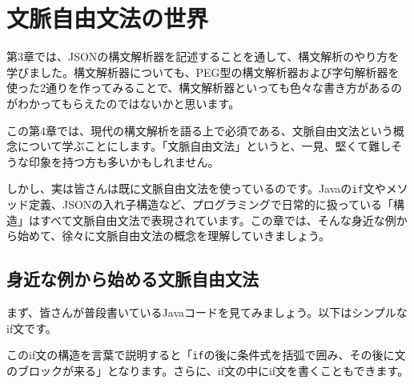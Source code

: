 \hypertarget{chapter4-ux6587ux8108ux81eaux7531ux6587ux6cd5ux306eux4e16ux754c}{%
\chapter{文脈自由文法の世界}\label{chapter4-ux6587ux8108ux81eaux7531ux6587ux6cd5ux306eux4e16ux754c}}

第3章では、JSONの構文解析器を記述することを通して、構文解析のやり方を学びました。構文解析器についても、PEG型の構文解析器および字句解析器を使った2通りを作ってみることで、構文解析器といっても色々な書き方があるのがわかってもらえたのではないかと思います。

この第4章では、現代の構文解析を語る上で必須である、文脈自由文法という概念について学ぶことにします。「文脈自由文法」というと、一見、堅くて難しそうな印象を持つ方も多いかもしれません。

しかし、実は皆さんは既に文脈自由文法を使っているのです。Javaの\texttt{if}文やメソッド定義、JSONの入れ子構造など、プログラミングで日常的に扱っている「構造」はすべて文脈自由文法で表現されています。この章では、そんな身近な例から始めて、徐々に文脈自由文法の概念を理解していきましょう。

\hypertarget{chapter4-ux8eabux8fd1ux306aux4f8bux304bux3089ux59cbux3081ux308bux6587ux8108ux81eaux7531ux6587ux6cd5}{%
\section{身近な例から始める文脈自由文法}\label{chapter4-ux8eabux8fd1ux306aux4f8bux304bux3089ux59cbux3081ux308bux6587ux8108ux81eaux7531ux6587ux6cd5}}

まず、皆さんが普段書いているJavaコードを見てみましょう。以下はシンプルなif文です。

\begin{Shaded}
\begin{Highlighting}[]
\NormalTok{) \{}
    \NormalTok{(}\NormalTok{);}
\NormalTok{\}}
\end{Highlighting}
\end{Shaded}

このif文の構造を言葉で説明すると「\texttt{if}の後に条件式を括弧で囲み、その後に文のブロックが来る」となります。さらに、if文の中にif文を書くこともできます。

